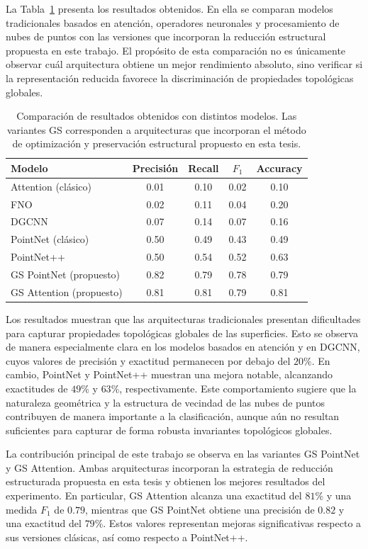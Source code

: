 La Tabla~\ref{tab:resultados_optimizacion} presenta los resultados obtenidos. En ella se comparan modelos tradicionales basados en atención, operadores neuronales y procesamiento de nubes de puntos con las versiones que incorporan la reducción estructural propuesta en este trabajo. El propósito de esta comparación no es únicamente observar cuál arquitectura obtiene un mejor rendimiento absoluto, sino verificar si la representación reducida favorece la discriminación de propiedades topológicas globales.

\begin{table}[H]
\centering
\caption{Comparación de resultados obtenidos con distintos modelos. Las variantes GS corresponden a arquitecturas que incorporan el método de optimización y preservación estructural propuesto en esta tesis.}
\label{tab:resultados_optimizacion}
\begin{tabular}{lcccc}
\toprule
\textbf{Modelo} & \textbf{Precisión} & \textbf{Recall} & \textbf{$F_{1}$} & \textbf{Accuracy} \\
\midrule
Attention (clásico) & 0.01 & 0.10 & 0.02 & 0.10 \\
FNO & 0.02 & 0.11 & 0.04 & 0.20 \\
DGCNN & 0.07 & 0.14 & 0.07 & 0.16 \\
PointNet (clásico) & 0.50 & 0.49 & 0.43 & 0.49 \\
PointNet++ & 0.50 & 0.54 & 0.52 & 0.63 \\
GS PointNet (propuesto) & 0.82 & 0.79 & 0.78 & 0.79 \\
GS Attention (propuesto) & 0.81 & 0.81 & 0.79 & 0.81 \\
\bottomrule
\end{tabular}
\end{table}

Los resultados muestran que las arquitecturas tradicionales presentan dificultades para capturar propiedades topológicas globales de las superficies. Esto se observa de manera especialmente clara en los modelos basados en atención y en DGCNN, cuyos valores de precisión y exactitud permanecen por debajo del $20\%$. En cambio, PointNet y PointNet++ muestran una mejora notable, alcanzando exactitudes de $49\%$ y $63\%$, respectivamente. Este comportamiento sugiere que la naturaleza geométrica y la estructura de vecindad de las nubes de puntos contribuyen de manera importante a la clasificación, aunque aún no resultan suficientes para capturar de forma robusta invariantes topológicos globales.

La contribución principal de este trabajo se observa en las variantes GS PointNet y GS Attention. Ambas arquitecturas incorporan la estrategia de reducción estructurada propuesta en esta tesis y obtienen los mejores resultados del experimento. En particular, GS Attention alcanza una exactitud del $81\%$ y una medida $F_1$ de $0.79$, mientras que GS PointNet obtiene una precisión de $0.82$ y una exactitud del $79\%$. Estos valores representan mejoras significativas respecto a sus versiones clásicas, así como respecto a PointNet++.

